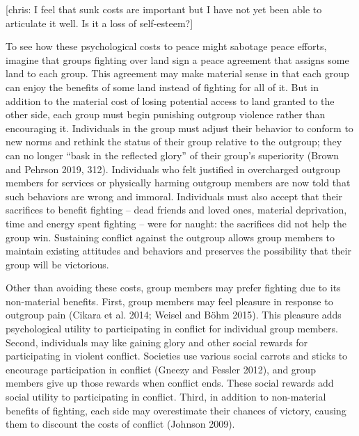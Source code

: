 \documentclass[11pt]{article}
\begin{document}
{[}chris: I feel that sunk costs are important but I have not yet been
able to articulate it well. Is it a loss of self-esteem?{]}

To see how these psychological costs to peace might sabotage peace
efforts, imagine that groups fighting over land sign a peace agreement
that assigns some land to each group. This agreement may make material
sense in that each group can enjoy the benefits of some land instead of
fighting for all of it. But in addition to the material cost of losing
potential access to land granted to the other side, each group must
begin punishing outgroup violence rather than encouraging it.
Individuals in the group must adjust their behavior to conform to new
norms and rethink the status of their group relative to the outgroup;
they can no longer ``bask in the reflected glory'' of their group's
superiority (Brown and Pehrson 2019, 312). Individuals who felt
justified in overcharged outgroup members for services or physically
harming outgroup members are now told that such behaviors are wrong and
immoral. Individuals must also accept that their sacrifices to benefit
fighting -- dead friends and loved ones, material deprivation, time and
energy spent fighting -- were for naught: the sacrifices did not help
the group win. Sustaining conflict against the outgroup allows group
members to maintain existing attitudes and behaviors and preserves the
possibility that their group will be victorious.

Other than avoiding these costs, group members may prefer fighting due
to its non-material benefits. First, group members may feel pleasure in
response to outgroup pain (Cikara et al. 2014; Weisel and Böhm 2015).
This pleasure adds psychological utility to participating in conflict
for individual group members. Second, individuals may like gaining glory
and other social rewards for participating in violent conflict.
Societies use various social carrots and sticks to encourage
participation in conflict (Gneezy and Fessler 2012), and group members
give up those rewards when conflict ends. These social rewards add
social utility to participating in conflict. Third, in addition to
non-material benefits of fighting, each side may overestimate their
chances of victory, causing them to discount the costs of conflict
(Johnson 2009).
\end{document}

